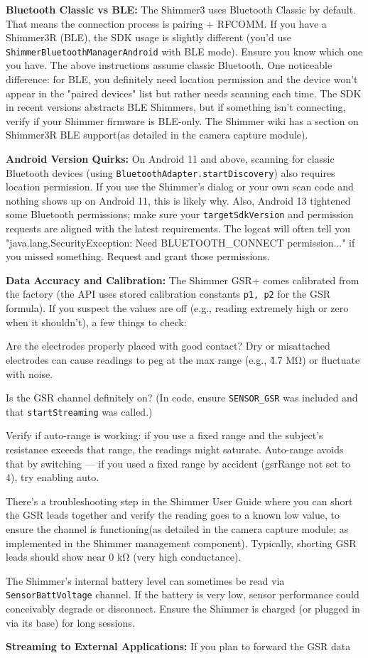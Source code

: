 \textbf{Bluetooth Classic vs BLE:} The Shimmer3 uses Bluetooth Classic by default. That means the connection process is pairing + RFCOMM. If you have a Shimmer3R (BLE), the SDK usage is slightly different (you'd use \texttt{ShimmerBluetoothManagerAndroid} with BLE mode). Ensure you know which one you have. The above instructions assume classic Bluetooth. One noticeable difference: for BLE, you definitely need location permission and the device won't appear in the "paired devices" list but rather needs scanning each time. The SDK in recent versions abstracts BLE Shimmers, but if something isn't connecting, verify if your Shimmer firmware is BLE-only. The Shimmer wiki has a section on Shimmer3R BLE support(as detailed in the camera capture module). \item \textbf{Android Version Quirks:} On Android 11 and above, scanning for classic Bluetooth devices (using \texttt{BluetoothAdapter.startDiscovery}) also requires location permission. If you use the Shimmer's dialog or your own scan code and nothing shows up on Android 11, this is likely why. Also, Android 13 tightened some Bluetooth permissions; make sure your \texttt{targetSdkVersion} and permission requests are aligned with the latest requirements. The logcat will often tell you "java.lang.SecurityException: Need BLUETOOTH_CONNECT permission..." if you missed something. Request and grant those permissions. \item \textbf{Data Accuracy and Calibration:} The Shimmer GSR+ comes calibrated from the factory (the API uses stored calibration constants \texttt{p1, p2} for the GSR formula). If you suspect the values are off (e.g., reading extremely high or zero when it shouldn't), a few things to check: \item Are the electrodes properly placed with good contact? Dry or misattached electrodes can cause readings to peg at the max range (e.g., \~4.7 MΩ) or fluctuate with noise. \item Is the GSR channel definitely on? (In code, ensure \texttt{SENSOR_GSR} was included and that \texttt{startStreaming} was called.) \item Verify if auto-range is working: if you use a fixed range and the subject's resistance exceeds that range, the readings might saturate. Auto-range avoids that by switching --- if you used a fixed range by accident (gsrRange not set to 4), try enabling auto. \item There's a troubleshooting step in the Shimmer User Guide where you can short the GSR leads together and verify the reading goes to a known low value, to ensure the channel is functioning(as detailed in the camera capture module; as implemented in the Shimmer management component). Typically, shorting GSR leads should show near 0 kΩ (very high conductance). \item The Shimmer's internal battery level can sometimes be read via \texttt{SensorBattVoltage} channel. If the battery is very low, sensor performance could conceivably degrade or disconnect. Ensure the Shimmer is charged (or plugged in via its base) for long sessions. \item \textbf{Streaming to External Applications:} If you plan to forward the GSR data 